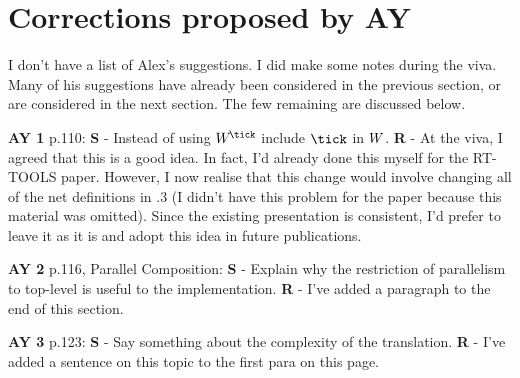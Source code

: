 \documentclass{article}
\begin{document}
\section{Corrections proposed by AY}
I don't have a list of Alex's suggestions. I did make some notes during
the viva. Many of his suggestions have already been considered in the
previous section, or are considered in the next section. The few remaining
are discussed below.
\begin{trivlist}
\item[\bf AY 1] p.110: \textbf{S} - Instead of using $\WTick$ include
$\tick$ in $W$. \textbf{R} - At the viva, I agreed that this is a
good idea. In fact, I'd already done this myself for the RT-TOOLS
paper. However, I now realise that this change would involve changing
all of the net definitions in .3 (I didn't have this problem
for the paper because this material was omitted). Since the existing
presentation is consistent, I'd prefer to leave it as it is and adopt this
idea in future publications.
\item[\bf AY 2] p.116, Parallel Composition: \textbf{S} - Explain why the
restriction of parallelism to top-level is useful to the
implementation. \textbf{R} - I've added a paragraph to the end of this section.
\item[\bf AY 3] p.123: \textbf{S} - Say something about the complexity of the 
translation. \textbf{R} - I've added a sentence on this topic to the first para
on this page.
\end{trivlist}
\end{document}
